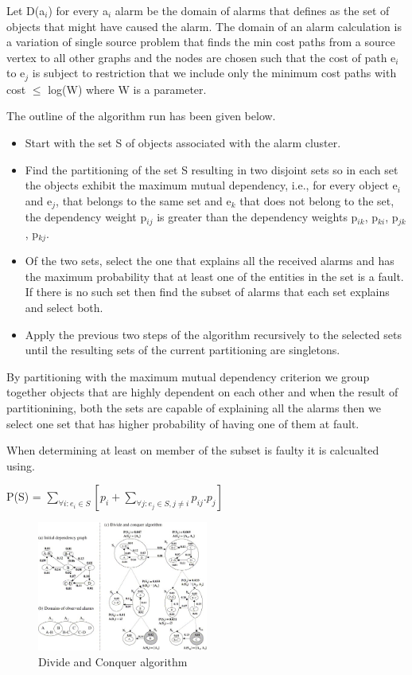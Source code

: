 \documentclass[10pt]{sigplan-proc-varsize}
\begin{document}
Let D(a$_i$) for every a$_i$ alarm be the domain of alarms that defines as the set of objects that might have caused the alarm.  The domain of an alarm calculation is a variation of single source problem that finds the min cost paths from a source vertex to all other graphs and the nodes are chosen such that the cost of path e$_i$ to e$_j$ is subject to restriction that we include only the minimum cost paths with cost $\leq$ log(W) where W is a parameter.

The outline of the algorithm run has been given below.

\begin{itemize}
  \item Start with the set S of objects associated with the alarm cluster.
  \item Find the partitioning of the set S resulting in two disjoint sets so in each set the objects exhibit the maximum mutual dependency, i.e., for every object e$_i$ and e$_j$, that belongs to the same set and e$_k$ that does not belong to the set, the dependency weight p$_{ij}$ is greater than the dependency weights p$_{ik}$, p$_{ki}$, p$_{jk}$, p$_{kj}$.
  \item Of the two sets, select the one that explains all the received alarms and has the maximum probability that at least one of the entities in the set is a fault. If there is no such set then find the subset of alarms that each set explains and select both.
  \item Apply the previous two steps of the algorithm recursively to the selected sets until the resulting sets of the current partitioning are singletons.
\end{itemize}

By partitioning with the maximum mutual dependency criterion we group together objects that are highly dependent on each other and when the result of partitionining, both the sets are capable of explaining all the alarms then we select one set that has higher probability of having one of them at fault. 

When determining at least on member of the subset is faulty it is calcualted using. 

P(S) = ${\underset{\forall i:e_i \in S}{\sum}}[p_i + \underset{\forall j:e_j \in S , j \neq i}{\sum} p_{ij}.p_j]$


\begin{figure}[h!]
  \caption{Divide and Conquer algorithm \cite{Katzela:95}}
  \centering
    \includegraphics[width=0.5\textwidth]{Fig5}
\end{figure}
\end{document}
